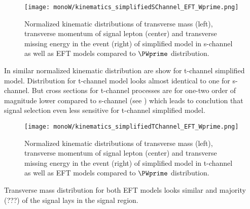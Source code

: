 
\begin{figure}[hb]
\texttt{[image: monoW/kinematics\_simplifiedSChannel\_EFT\_Wprime.png]}
\caption{Normalized kinematic distributions of transverse mass (left), transverse momentum of signal lepton (center) and transverse missing energy in the event (right) of simplified model in s-channel as well as EFT models compared to $\PWprime$ distribution.}
  \label{fig:kinematicsSChannel}
\end{figure}

In  similar normalized kinematic distribution are show for t-channel simplified model. Distribution for t-channel model looks almost identical to one
for s-channel. But cross sections for t-channel processes are for one-two order of magnitude lower compared to s-channel (see ) which leads to conclution
that signal selection even less sensitive for t-channel simplified model.

\begin{figure}[hb]
\texttt{[image: monoW/kinematics\_simplifiedTChannel\_EFT\_Wprime.png]}
\caption{Normalized kinematic distributions of transverse mass (left), transverse momentum of signal lepton (center) and transverse missing energy in the event (right) of simplified model in t-channel as well as EFT models compared to $\PWprime$ distribution.}
  \label{fig:kinematicsTChannel}
\end{figure}

Transverse mass distribution for both EFT models looks similar and majority (???) of the signal lays in the signal region. 


